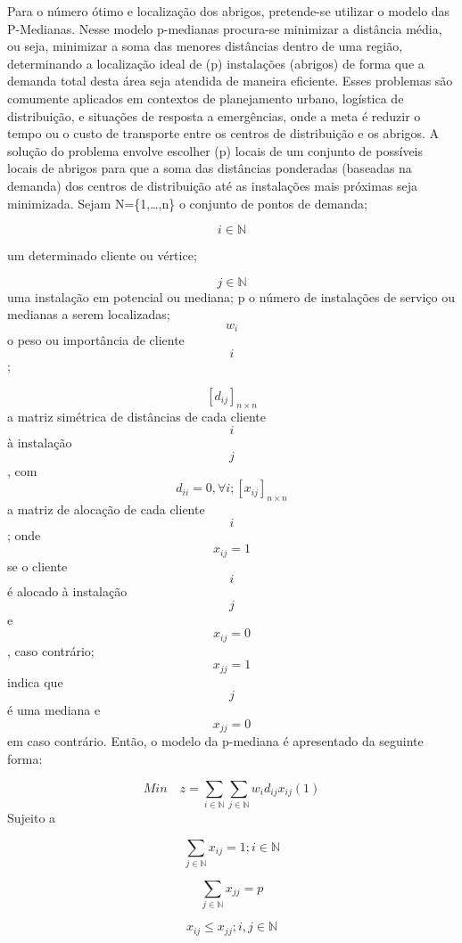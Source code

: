 \documentclass[
]{article}
\begin{document}
Para o número ótimo e localização dos abrigos, pretende-se utilizar o
modelo das P-Medianas. Nesse modelo p-medianas procura-se minimizar a
distância média, ou seja, minimizar a soma das menores distâncias dentro
de uma região, determinando a localização ideal de (p) instalações
(abrigos) de forma que a demanda total desta área seja atendida de
maneira eficiente. Esses problemas são comumente aplicados em contextos
de planejamento urbano, logística de distribuição, e situações de
resposta a emergências, onde a meta é reduzir o tempo ou o custo de
transporte entre os centros de distribuição e os abrigos. A solução do
problema envolve escolher (p) locais de um conjunto de possíveis locais
de abrigos para que a soma das distâncias ponderadas (baseadas na
demanda) dos centros de distribuição até as instalações mais próximas
seja minimizada. Sejam N=\{1,\ldots,n\} o conjunto de pontos de demanda;

\[
i \in \mathbb{N}
\]

um determinado cliente ou vértice;

\[
j \in \mathbb{N}
\] uma instalação em potencial ou mediana; p o número de instalações de
serviço ou medianas a serem localizadas; \[
w_i
\] o peso ou importância de cliente \[
i
\];

\[
[d_{ij}]_{n \times n}
\] a matriz simétrica de distâncias de cada cliente \[i\] à instalação
\[
j
\] , com \[
d_{ii}=0, \forall i; [x_{ij}]_{n \times n} 
\] a matriz de alocação de cada cliente \[i\]; onde \[
x_{ij}=1
\] se o cliente \[
i
\] é alocado à instalação \[
j
\] e \[
x_{ij}=0
\] , caso contrário; \[
x_{jj}=1
\] indica que \[
j
\] é uma mediana e \[
x_{jj}=0
\] em caso contrário. Então, o modelo da p-mediana é apresentado da
seguinte forma:

\[
Min \quad  z=\sum_{i \in \mathbb{N}} \sum_{j \in \mathbb{N}} w_{i}d_{ij}x_{ij}    (1)
\] Sujeito a

\[
\sum_{j \in \mathbb{N}}x_{ij}=1; i \in \mathbb{N}
\]

\[
\sum_{j \in \mathbb{N}}x_{jj}=p
\]

\[
x_{ij} \leq x_{jj}; i,j \in \mathbb{N}
\]
\end{document}
